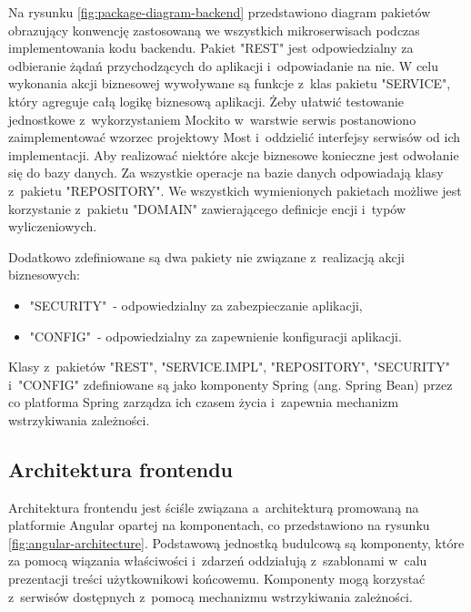 \noindent
{}

Na rysunku \ref{fig:package-diagram-backend} przedstawiono diagram pakietów obrazujący konwencję zastosowaną we wszystkich mikroserwisach podczas implementowania kodu backendu.
Pakiet "REST" jest odpowiedzialny za odbieranie żądań przychodzących do aplikacji i~odpowiadanie na nie.
W celu wykonania akcji biznesowej wywoływane są funkcje z~klas pakietu "SERVICE", który agreguje całą logikę biznesową aplikacji.
Żeby ułatwić testowanie jednostkowe z~wykorzystaniem Mockito w~warstwie serwis postanowiono zaimplementować wzorzec projektowy Most\cite{book:wzorce-projektowe} i~oddzielić interfejsy serwisów od ich implementacji.
Aby realizować niektóre akcje biznesowe konieczne jest odwołanie się do bazy danych.
Za wszystkie operacje na bazie danych odpowiadają klasy z~pakietu "REPOSITORY".
We wszystkich wymienionych pakietach możliwe jest korzystanie z~pakietu "DOMAIN" zawierającego definicje encji i~typów wyliczeniowych.

\par
Dodatkowo zdefiniowane są dwa pakiety nie związane z~realizacją akcji biznesowych:
\begin{itemize}
    \item "SECURITY"~- odpowiedzialny za zabezpieczanie aplikacji,
    \item "CONFIG"~- odpowiedzialny za zapewnienie konfiguracji aplikacji.
\end{itemize}

\par
Klasy z~pakietów "REST", "SERVICE.IMPL", "REPOSITORY", "SECURITY" i~"CONFIG" zdefiniowane są jako komponenty Spring (ang. Spring Bean) przez co platforma Spring zarządza ich czasem życia i~zapewnia mechanizm wstrzykiwania zależności\cite{book:spring-w-akcji}.

\subsection{Architektura frontendu}\label{subsec:system-architecture:frontend}

\noindent
{}

Architektura frontendu jest ściśle związana a~architekturą promowaną na platformie Angular opartej na komponentach,
co przedstawiono na rysunku \ref{fig:angular-architecture}.
Podstawową jednostką budulcową są komponenty, które za pomocą wiązania właściwości i~zdarzeń oddziałują z~szablonami w~calu prezentacji treści użytkownikowi końcowemu.
Komponenty mogą korzystać z~serwisów dostępnych z~pomocą mechanizmu wstrzykiwania zależności.

